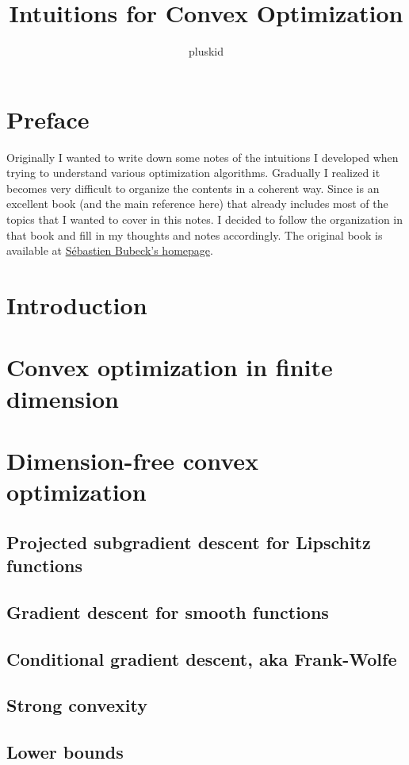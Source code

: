 \documentclass{scrartcl}
\title{Intuitions for Convex Optimization}
\author{pluskid}
\begin{document}
\maketitle
\tableofcontents

\section*{Preface}
Originally I wanted to write down some notes of the intuitions I developed when trying to
understand various optimization algorithms. Gradually I realized it becomes very difficult to
organize the contents in a coherent way. Since \citet {MAL-050} is an excellent book (and the main
reference here) that already includes most of the topics that I wanted to cover in this notes. I
decided to follow the organization in that book and fill in my thoughts and notes accordingly. The
original book is available at \href{http://www.princeton.edu/~sbubeck/}{S{\'e}bastien Bubeck's
homepage}.

\section{Introduction}
\section{Convex optimization in finite dimension}
\section{Dimension-free convex optimization}
\subsection{Projected subgradient descent for Lipschitz functions}
\subsection{Gradient descent for smooth functions}
\subsection{Conditional gradient descent, aka Frank-Wolfe}
\subsection{Strong convexity}
\subsection{Lower bounds}
\end{document}
